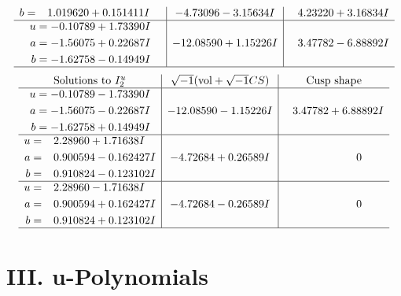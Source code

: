 \documentclass[1p]{elsarticle_modified}
\theoremstyle{definition}
\newcommand{\I}{\sqrt{-1}}
\begin{document}
$$\begin{array}{c|c|c}
\begin{aligned}
b &= \phantom{-}1.019620 + 0.151411 I\end{aligned}
 & -4.73096 - 3.15634 I & \phantom{-}4.23220 + 3.16834 I \\ \hline\begin{aligned}
u &= -0.10789 + 1.73390 I \\
a &= -1.56075 + 0.22687 I \\
b &= -1.62758 - 0.14949 I\end{aligned}
 & -12.08590 + 1.15226 I & \phantom{-}3.47782 - 6.88892 I\\
 \hline 
 \end{array}$$\newpage$$\begin{array}{c|c|c}  
\text{Solutions to }I^u_{2}& \I (\text{vol} + \sqrt{-1}CS) & \text{Cusp shape}\\
 \hline 
\begin{aligned}
u &= -0.10789 - 1.73390 I \\
a &= -1.56075 - 0.22687 I \\
b &= -1.62758 + 0.14949 I\end{aligned}
 & -12.08590 - 1.15226 I & \phantom{-}3.47782 + 6.88892 I \\ \hline\begin{aligned}
u &= \phantom{-}2.28960 + 1.71638 I \\
a &= \phantom{-}0.900594 - 0.162427 I \\
b &= \phantom{-}0.910824 - 0.123102 I\end{aligned}
 & -4.72684 + 0.26589 I & \phantom{-0.000000 } 0 \\ \hline\begin{aligned}
u &= \phantom{-}2.28960 - 1.71638 I \\
a &= \phantom{-}0.900594 + 0.162427 I \\
b &= \phantom{-}0.910824 + 0.123102 I\end{aligned}
 & -4.72684 - 0.26589 I & \phantom{-0.000000 } 0\\
 \hline 
 \end{array}$$\newpage
\newpage\renewcommand{\arraystretch}{1}
\centering \section*{ III. u-Polynomials}
\end{document}
